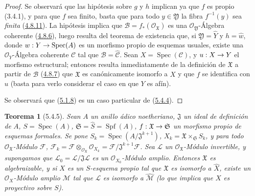 \documentclass[10pt,oneside,openany]{book}
\theoremstyle{egaenv}\newtheorem*{env}{---}
\theoremstyle{egastatement}
\newtheorem*{theorem}{Teorema}
\theoremstyle{egadescription}
\newcommand{\oldpage}[2][]{\marginnote{\normalfont\scriptsize\textbf{#1}\,|\,#2}\ignorespaces}
\renewcommand{\to}{\mathchoice{\longrightarrow}{\rightarrow}{\rightarrow}{\rightarrow}}
\begin{document}
\begin{proof}
Se observará que las hipótesis sobre $g$ y $h$ implican ya que $f$ es propio
(3.4.1), y para que $f$ sea finito, basta que para todo $y\in\mathfrak Y$ la
fibra $f^{-1}(y)$ sea \emph{finita} (\hyperref[III.4.8.11-fr]{4.8.11}). La hipótesis
implica que $\mathcal B=f_*(\mathcal O_{\mathfrak X})$ es una
$\mathcal O_{\mathfrak Y}$-Álgebra coherente
(\hyperref[III.4.8.6-fr]{4.8.6}), luego resulta del teorema de existencia que, si
$\mathfrak Y=\widehat Y$ y $h=\widehat w$, donde
$w:Y\to\operatorname{Spec}(A)$ es un morfismo propio de esquemas usuales,
existe una $\mathcal O_Y$-Álgebra coherente $\mathcal C$ tal que
$\mathcal B=\widehat{\mathcal C}$. Sean $X=\operatorname{Spec}(\mathcal C)$, y
$u:X\to Y$ el morfismo estructural; entonces resulta inmediatamente de la definición de
$\mathfrak X$ a partir de $\mathcal B$
(\hyperref[III.4.8.7-fr]{4.8.7}) que $\mathfrak X$ es canónicamente isomorfo a
$\widehat X$ y que $f$ se identifica con $\widehat u$ (basta para verlo
considerar el caso en que $Y$ es afín).

Se observará que (\hyperref[III.5.1.8-fr]{5.1.8}) es un caso particular de
(\hyperref[III.5.4.4-fr]{5.4.4}).
\end{proof}

\begin{theorem}[5.4.5]
\label{III.5.4.5-fr}
Sean $A$ un anillo ádico noetheriano, $\mathfrak J$ un ideal de definición de
$A$, $S=\operatorname{Spec}(A)$,
$\mathfrak S=\widehat S=\operatorname{Spf}(A)$,
$f:\mathfrak X\to\mathfrak S$ un morfismo propio de esquemas formales. Se pone
$S_k=\operatorname{Spec}(A/\mathfrak J^{k+1})$,
$X_k=\mathfrak X\times_{\mathfrak S}S_k$, y para todo
$\mathcal O_{\mathfrak X}$-Módulo $\mathcal F$,
$\mathcal F_k=\mathcal F\otimes_{\mathcal O_{\mathfrak X}}\mathcal O_{X_k}
=\mathcal F/\mathfrak J^{k+1}\mathcal F$.
\oldpage[III]{158}
Sea $\mathcal L$ un $\mathcal O_{\mathfrak X}$-Módulo invertible, y supongamos
que $\mathcal L_0=\mathcal L/\mathfrak J\mathcal L$ es un
$\mathcal O_{X_0}$-Módulo amplio. Entonces $\mathfrak X$ es algebraizable, y si
$X$ es un $S$-esquema propio tal que $\mathfrak X$ es isomorfo a
$\widehat X$, existe un $\mathcal O_X$-Módulo amplio $\mathcal M$ tal que
$\mathcal L$ es isomorfo a $\widehat{\mathcal M}$ \textup{(lo que implica que
$X$ es \emph{proyectivo} sobre $S$)}.
\end{theorem}
\end{document}
